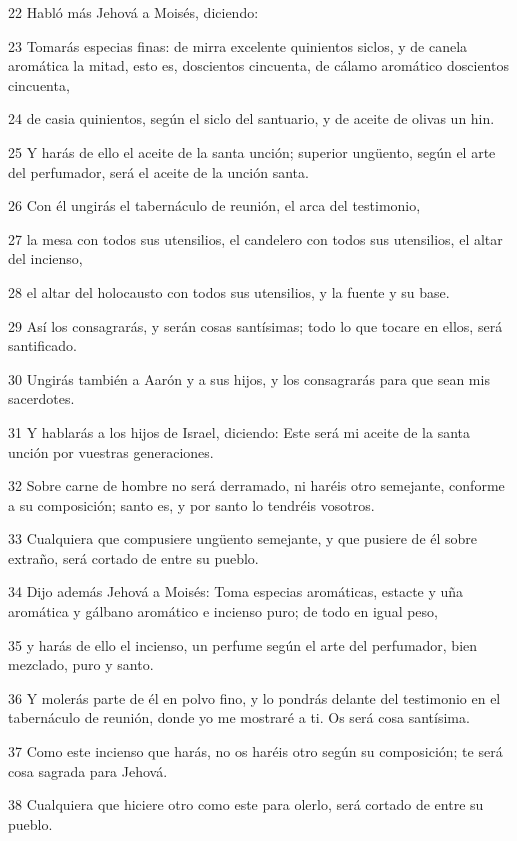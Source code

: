 \par 22 Habló más Jehová a Moisés, diciendo:
\par 23 Tomarás especias finas: de mirra excelente quinientos siclos,  y de canela aromática la mitad, esto es, doscientos cincuenta, de cálamo aromático doscientos cincuenta,
\par 24 de casia quinientos, según el siclo del santuario, y de aceite de olivas un hin.
\par 25 Y harás de ello el aceite de la santa unción; superior ungüento, según el arte del perfumador, será el aceite de la unción santa.
\par 26 Con él ungirás el tabernáculo de reunión, el arca del testimonio,
\par 27 la mesa con todos sus utensilios, el candelero con todos sus utensilios, el altar del incienso,
\par 28 el altar del holocausto con todos sus utensilios, y la fuente y su base.
\par 29 Así los consagrarás, y serán cosas santísimas; todo lo que tocare en ellos, será santificado.
\par 30 Ungirás también a Aarón y a sus hijos, y los consagrarás para que sean mis sacerdotes.
\par 31 Y hablarás a los hijos de Israel, diciendo: Este será mi aceite de la santa unción por vuestras generaciones.
\par 32 Sobre carne de hombre no será derramado, ni haréis otro semejante, conforme a su composición; santo es, y por santo lo tendréis vosotros.
\par 33 Cualquiera que compusiere ungüento semejante, y que pusiere de él sobre extraño, será cortado de entre su pueblo.
\par 34 Dijo además Jehová a Moisés: Toma especias aromáticas, estacte y uña aromática y gálbano aromático e incienso puro; de todo en igual peso,
\par 35 y harás de ello el incienso, un perfume según el arte del perfumador, bien mezclado, puro y santo.
\par 36 Y molerás parte de él en polvo fino, y lo pondrás delante del testimonio en el tabernáculo de reunión, donde yo me mostraré a ti. Os será cosa santísima.
\par 37 Como este incienso que harás, no os haréis otro según su composición; te será cosa sagrada para Jehová.
\par 38 Cualquiera que hiciere otro como este para olerlo, será cortado de entre su pueblo.

